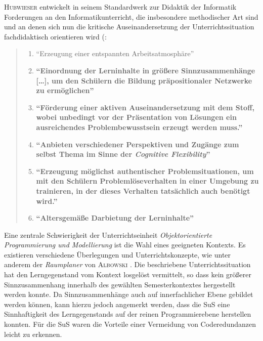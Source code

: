 \documentclass[paper=a4, DIV=13, BCOR=8mm, oneside=on, onecolumn=on, open = any, titlepage =on, parskip =half-, headsepline = on, footsepline = off, chapterprefix = on, sectionprefix = on, appendixprefix = off, fontsize = 12pt, numbers = noenddot, abstract = off]{scrreprt}
\begin{document}
\textsc{Hubwieser} entwickelt in seinem Standardwerk zur Didaktik der Informatik Forderungen an den Informatikunterricht, die insbesondere methodischer Art sind und an denen sich nun die kritische Auseinandersetzung der Unterrichtssituation fachdidaktisch orientieren wird (\cite[S.67]{hubwieser:07}:
\begin{quote}
\begin{enumerate}
\item "`Erzeugung einer entspannten Arbeitsatmosphäre"'
\item\textbf{ "`Einordnung der Lerninhalte in größere Sinnzusammenhänge […], um den Schülern die Bildung präpositionaler Netzwerke zu ermöglichen"'}
\item \textbf{"`Förderung einer aktiven Auseinandersetzung mit dem Stoff, wobei unbedingt vor der Präsentation von Lösungen ein ausreichendes Problembewusstsein erzeugt werden muss."'}
\item \textbf{"`Anbieten verschiedener Perspektiven und Zugänge zum selbst Thema im Sinne der \emph{Cognitive Flexibility}"'}
\item \textbf{ "`Erzeugung möglichst authentischer Problemsituationen, um mit den Schülern Problemlöseverhalten in einer Umgebung zu trainieren, in der dieses Verhalten tatsächlich auch benötigt wird."'}
\item \textbf{"`Altersgemäße Darbietung der Lerninhalte"'}
\end{enumerate}
\end{quote}


\onehalfspacing

Eine zentrale Schwierigkeit der Unterrichtseinheit \emph{Objektorientierte Programmierung und Modellierung} ist die Wahl eines geeigneten Kontexts. Es existieren verschiedene Überlegungen und Unterrichtskonzepte, wie unter anderem der \emph{Raumplaner} von \textsc{Albowski} \cite{albowski}. Die beschriebene Unterrichtssituation hat den Lerngegenstand vom Kontext losgelöst vermittelt, so dass kein größerer Sinnzusammenhang innerhalb des gewählten Semesterkontextes hergestellt werden konnte. Da Sinnzusammenhänge auch auf innerfachlicher Ebene gebildet werden können, kann hierzu jedoch angemerkt werden, dass die SuS eine Sinnhaftigkeit des Lerngegenstands auf der reinen Programmierebene herstellen konnten. Für die SuS waren die Vorteile einer Vermeidung von Coderedundanzen leicht zu erkennen. 
\end{document}
